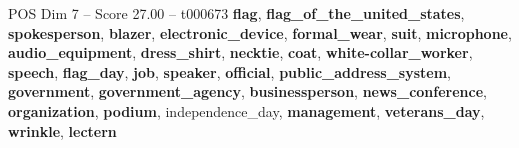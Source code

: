 \begin{textsample}{POS Dim 7 – Score 27.00 – t000673}  \label{ex:f7_pos_022}
\textbf{flag}, \textbf{flag\_of\_the\_united\_states}, \textbf{spokesperson}, \textbf{blazer}, \textbf{electronic\_device}, \textbf{formal\_wear}, \textbf{suit}, \textbf{microphone}, \textbf{audio\_equipment}, \textbf{dress\_shirt}, \textbf{necktie}, \textbf{coat}, \textbf{white-collar\_worker}, \textbf{speech}, \textbf{flag\_day}, \textbf{job}, \textbf{speaker}, \textbf{official}, \textbf{public\_address\_system}, \textbf{government}, \textbf{government\_agency}, \textbf{businessperson}, \textbf{news\_conference}, \textbf{organization}, \textbf{podium}, independence\_day, \textbf{management}, \textbf{veterans\_day}, \textbf{wrinkle}, \textbf{lectern}

\end{textsample}
